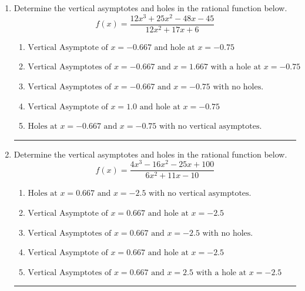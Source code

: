 \documentclass[14pt]{extbook}
\newcommand{\litem}[1]{\item#1\hspace*{-1cm}\rule{\textwidth}{0.4pt}}
\begin{document}
\begin{enumerate}
{\begin{enumerate}[label=\Alph*.]
\end{enumerate} }
\litem{
Determine the vertical asymptotes and holes in the rational function below.\[ f(x) = \frac{12x^{3} +25 x^{2} -48 x -45}{12x^{2} +17 x + 6} \]\begin{enumerate}[label=\Alph*.]
\item \( \text{Vertical Asymptote of } x = -0.667 \text{ and hole at } x = -0.75 \)
\item \( \text{Vertical Asymptotes of } x = -0.667 \text{ and } x = 1.667 \text{ with a hole at } x = -0.75 \)
\item \( \text{Vertical Asymptotes of } x = -0.667 \text{ and } x = -0.75 \text{ with no holes.} \)
\item \( \text{Vertical Asymptote of } x = 1.0 \text{ and hole at } x = -0.75 \)
\item \( \text{Holes at } x = -0.667 \text{ and } x = -0.75 \text{ with no vertical asymptotes.} \)

\end{enumerate} }
\litem{
Determine the vertical asymptotes and holes in the rational function below.\[ f(x) = \frac{4x^{3} -16 x^{2} -25 x + 100}{6x^{2} +11 x -10} \]\begin{enumerate}[label=\Alph*.]
\item \( \text{Holes at } x = 0.667 \text{ and } x = -2.5 \text{ with no vertical asymptotes.} \)
\item \( \text{Vertical Asymptote of } x = 0.667 \text{ and hole at } x = -2.5 \)
\item \( \text{Vertical Asymptotes of } x = 0.667 \text{ and } x = -2.5 \text{ with no holes.} \)
\item \( \text{Vertical Asymptote of } x = 0.667 \text{ and hole at } x = -2.5 \)
\item \( \text{Vertical Asymptotes of } x = 0.667 \text{ and } x = 2.5 \text{ with a hole at } x = -2.5 \)


\end{enumerate}}
\end{enumerate}
\end{document}

